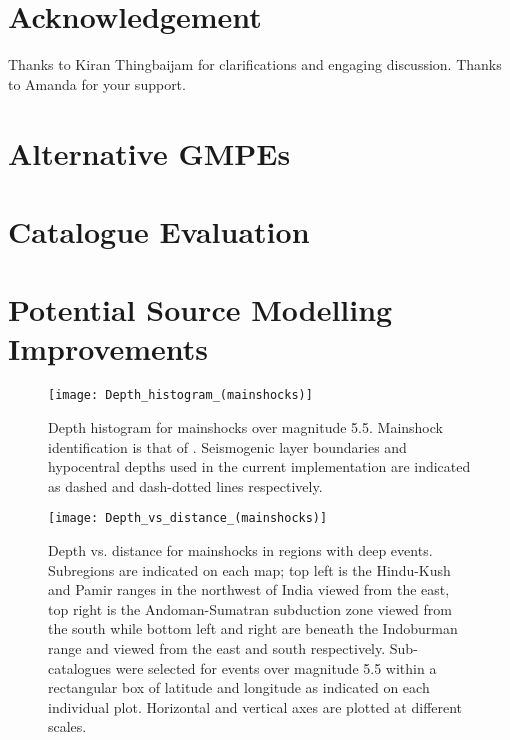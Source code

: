 \documentclass{article}
\begin{document}
\section*{Acknowledgement}
Thanks to Kiran Thingbaijam for clarifications and engaging discussion.
Thanks to Amanda for your support.

\cleardoublepage
{}
{}



\begin{appendices}

\section{Alternative GMPEs}
\label{app:AlternativeGmpes}

\section{Catalogue Evaluation}
\label{app:Catalogue}

\section{Potential Source Modelling Improvements}
\label{app:SourceModelImprovements}

\begin{figure}[htb]
\begin{adjustbox}{center}
\texttt{[image: Depth\_histogram\_(mainshocks)]}
\end{adjustbox}
\caption[Depth histogram for mainshocks]{Depth histogram for mainshocks over magnitude 5.5.
Mainshock identification is that of \cite{nath2010earthquake}.
Seismogenic layer boundaries and hypocentral depths used in the current implementation are indicated as dashed and dash-dotted lines respectively.}
\label{fig:DepthHistogram}
\end{figure}

\begin{figure}[!htb]
\begin{adjustbox}{center}
\texttt{[image: Depth\_vs\_distance\_(mainshocks)]}
\end{adjustbox}
\caption[Depth vs.
distance for mainshocks in regions with deep events]{Depth vs.
distance for mainshocks in regions with deep events.
Subregions are indicated on each map; top left is the Hindu-Kush and Pamir ranges in the northwest of India viewed from the east, top right is the Andoman-Sumatran subduction zone viewed from the south while bottom left and right are beneath the Indoburman range and viewed from the east and south respectively.
Sub-catalogues were selected for events over magnitude 5.5 within a rectangular box of latitude and longitude as indicated on each individual plot.
 Horizontal and vertical axes are plotted at different scales.}
\label{fig:DepthVsDistance}
\end{figure}


\end{appendices}
\end{document}

